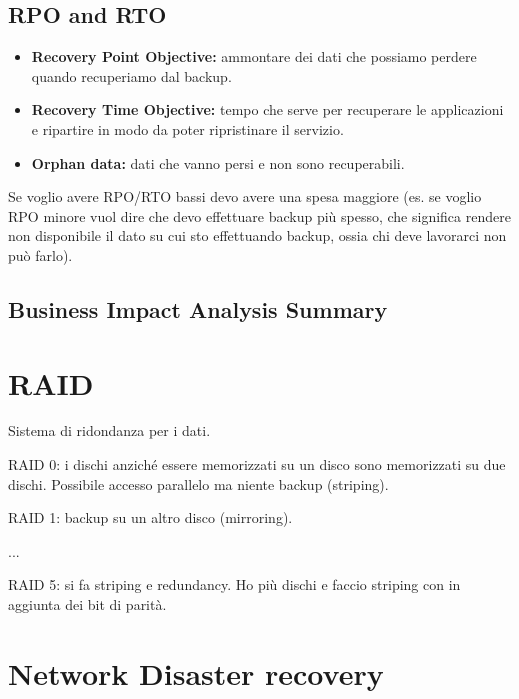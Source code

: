 \subsection{RPO and RTO}

\begin{itemize}
 \item \textbf{Recovery Point Objective:} ammontare dei dati che possiamo 
perdere quando recuperiamo dal backup.

 \item \textbf{Recovery Time Objective:} tempo che serve per recuperare le 
applicazioni e ripartire in modo da poter ripristinare il servizio.

 \item \textbf{Orphan data:} dati che vanno persi e non sono recuperabili.
\end{itemize}

Se voglio avere RPO/RTO bassi devo avere una spesa maggiore (es. se voglio RPO 
minore vuol dire che devo effettuare backup più spesso, che significa rendere 
non disponibile il dato su cui sto effettuando backup, ossia chi deve lavorarci 
non può farlo).

\subsection{Business Impact Analysis Summary}


\section{RAID}

Sistema di ridondanza per i dati.

RAID 0: i dischi anziché essere memorizzati su un disco sono memorizzati su due 
dischi. Possibile accesso parallelo ma niente backup (striping).

RAID 1: backup su un altro disco (mirroring).

...

RAID 5: si fa striping e redundancy. Ho più dischi e faccio striping con in 
aggiunta dei bit di parità.

\section{Network Disaster recovery}


